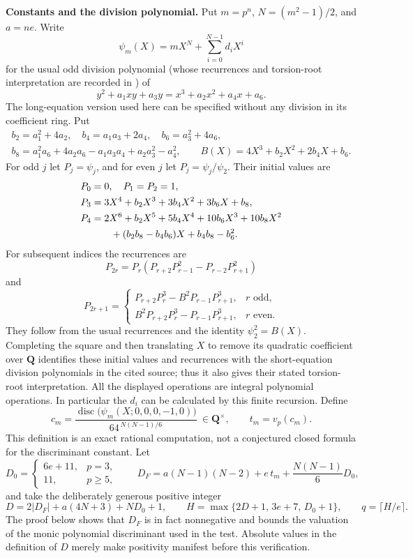 \par\smallskip\noindent\textbf{Constants and the division polynomial.}
Put $m=p^n$, $N=(m^2-1)/2$, and $a=ne$.  Write
\[
 \psi_m(X)=mX^N+\sum_{i=0}^{N-1}d_iX^i
\]
for the usual odd division polynomial (whose recurrences and torsion-root interpretation are recorded in \cite[section~1.1.3, pp.~8--9]{Burhanuddin2007}) of
\[
 y^2+a_1xy+a_3y=x^3+a_2x^2+a_4x+a_6.
\]
The long-equation version used here can be specified without any division in its coefficient ring.  Put
\[
\begin{gathered}
 b_2=a_1^2+4a_2,\quad b_4=a_1a_3+2a_4,\quad
 b_6=a_3^2+4a_6,\\
 b_8=a_1^2a_6+4a_2a_6-a_1a_3a_4+a_2a_3^2-a_4^2,\qquad
 B(X)=4X^3+b_2X^2+2b_4X+b_6.
\end{gathered}
\]
For odd $j$ let $P_j=\psi_j$, and for even $j$ let
$P_j=\psi_j/\psi_2$.  Their initial values are
\[
\begin{aligned}
 P_0&=0,\quad P_1=P_2=1,\\
 P_3&=3X^4+b_2X^3+3b_4X^2+3b_6X+b_8,\\
 P_4&=2X^6+b_2X^5+5b_4X^4+10b_6X^3+10b_8X^2\\
    &\hspace{7mm}+(b_2b_8-b_4b_6)X+b_4b_8-b_6^2.
\end{aligned}
\]
For subsequent indices the recurrences are
\[
 P_{2r}=P_r(P_{r+2}P_{r-1}^2-P_{r-2}P_{r+1}^2)
\]
and
\[
 P_{2r+1}=
 \begin{cases}
 P_{r+2}P_r^3-B^2P_{r-1}P_{r+1}^3,&r\text{ odd},\\
 B^2P_{r+2}P_r^3-P_{r-1}P_{r+1}^3,&r\text{ even}.
 \end{cases}
\]
They follow from the usual recurrences and the identity $\psi_2^2=B(X)$.
Completing the square and then translating $X$ to remove its quadratic coefficient over $\mathbf Q$ identifies these initial values and recurrences with the short-equation division polynomials in the cited source; thus it also gives their stated torsion-root interpretation.  All the displayed operations are integral polynomial operations.  In particular the $d_i$ can be calculated by this finite recursion.  Define
\[
 c_m=\frac{\operatorname{disc}\bigl(\psi_m(X;0,0,0,-1,0)\bigr)}
                  {64^{\,N(N-1)/6}}\ \in\mathbf Q^\times,
 \qquad t_m=v_p(c_m).
\]
This definition is an exact rational computation, not a conjectured closed formula for the discriminant constant.
Let
\[
 D_0=\begin{cases}6e+11,&p=3,\\11,&p\geq5,\end{cases}
 \qquad
 D_F=a(N-1)(N-2)+e\,t_m+\frac{N(N-1)}6D_0,
\]
and take the deliberately generous positive integer
\[
 D=2|D_F|+a(4N+3)+ND_0+1,\qquad
 H=\max\{2D+1,\,3e+7,\,D_0+1\},\qquad q=\lceil H/e\rceil.
\]
The proof below shows that $D_F$ is in fact nonnegative and bounds the valuation of the monic polynomial discriminant used in the test.  Absolute values in the definition of $D$ merely make positivity manifest before this verification.

